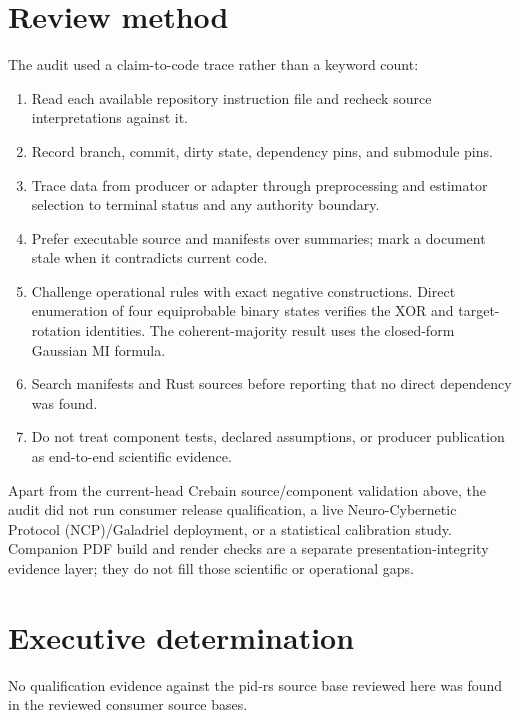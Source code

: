 \documentclass[11pt]{article}
\begin{document}
\section{Review method}

The audit used a claim-to-code trace rather than a keyword count:
\begin{enumerate}
\item Read each available repository instruction file and recheck source interpretations against it.
\item Record branch, commit, dirty state, dependency pins, and submodule pins.
\item Trace data from producer or adapter through preprocessing and estimator selection to terminal status and any authority boundary.
\item Prefer executable source and manifests over summaries; mark a document stale when it contradicts current code.
\item Challenge operational rules with exact negative constructions.  Direct enumeration of four equiprobable binary states verifies the XOR and target-rotation identities.  The coherent-majority result uses the closed-form Gaussian MI formula.
\item Search manifests and Rust sources before reporting that no direct dependency was found.
\item Do not treat component tests, declared assumptions, or producer publication as end-to-end scientific evidence.
\end{enumerate}

Apart from the current-head Crebain source/component validation above, the
audit did not run consumer release qualification, a live Neuro-Cybernetic
Protocol (NCP)/Galadriel deployment, or a statistical calibration study.
Companion PDF build and render checks are a separate presentation-integrity
evidence layer; they do not fill those scientific or operational gaps.

\section{Executive determination}

No qualification evidence against the pid-rs source base reviewed here was
found in the reviewed consumer source bases.
\end{document}
